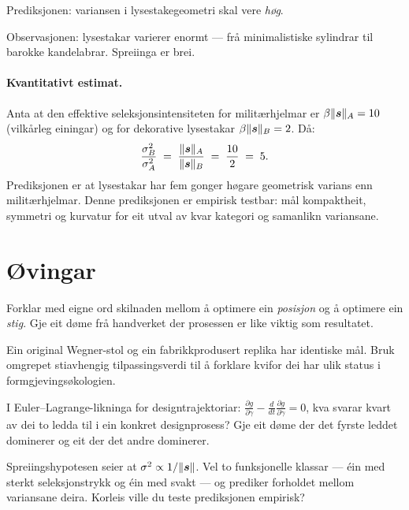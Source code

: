 \medskip
Prediksjonen: variansen i lysestakegeometri skal vere
\emph{høg}.

\medskip
Observasjonen: lysestakar varierer enormt --- frå minimalistiske
sylindrar til barokke kandelabrar. Spreiinga er brei.

\paragraph{Kvantitativt estimat.}
Anta at den effektive seleksjonsintensiteten for militærhjelmar er
$\beta \lVert \bm{s} \rVert_A = 10$ (vilkårleg einingar) og for
dekorative lysestakar $\beta \lVert \bm{s} \rVert_B = 2$. Då:
\[
  \frac{\sigma^2_B}{\sigma^2_A}
  \;=\; \frac{\lVert \bm{s} \rVert_A}{\lVert \bm{s} \rVert_B}
  \;=\; \frac{10}{2} \;=\; 5.
\]
Prediksjonen er at lysestakar har fem gonger høgare geometrisk
varians enn militærhjelmar. Denne prediksjonen er empirisk
testbar: mål kompaktheit, symmetri og kurvatur for eit utval
av kvar kategori og samanlikn variansane.


\section{Øvingar}

\begin{exercise}[Nivå 1]\label{ex:7.1}
Forklar med eigne ord skilnaden mellom å optimere ein
\emph{posisjon} og å optimere ein \emph{stig}. Gje eit døme frå
handverket der prosessen er like viktig som resultatet.
\end{exercise}

\begin{exercise}[Nivå 1]\label{ex:7.2}
Ein original Wegner-stol og ein fabrikkprodusert replika har
identiske mål. Bruk omgrepet stiavhengig tilpassingsverdi til å
forklare kvifor dei har ulik status i formgjevingsøkologien.
\end{exercise}

\begin{exercise}[Nivå 2]\label{ex:7.3}
I Euler--Lagrange-likninga for designtrajektoriar:
$\frac{\partial g}{\partial \gamma}
- \frac{d}{dt}\frac{\partial g}{\partial \dot{\gamma}} = 0$,
kva svarar kvart av dei to ledda til i ein konkret designprosess?
Gje eit døme der det fyrste leddet dominerer og eit der det andre
dominerer.
\end{exercise}

\begin{exercise}[Nivå 2]\label{ex:7.4}
Spreiingshypotesen seier at $\sigma^2 \propto 1/\lVert \bm{s} \rVert$.
Vel to funksjonelle klassar --- éin med sterkt seleksjonstrykk og
éin med svakt --- og prediker forholdet mellom variansane deira.
Korleis ville du teste prediksjonen empirisk?
\end{exercise}

